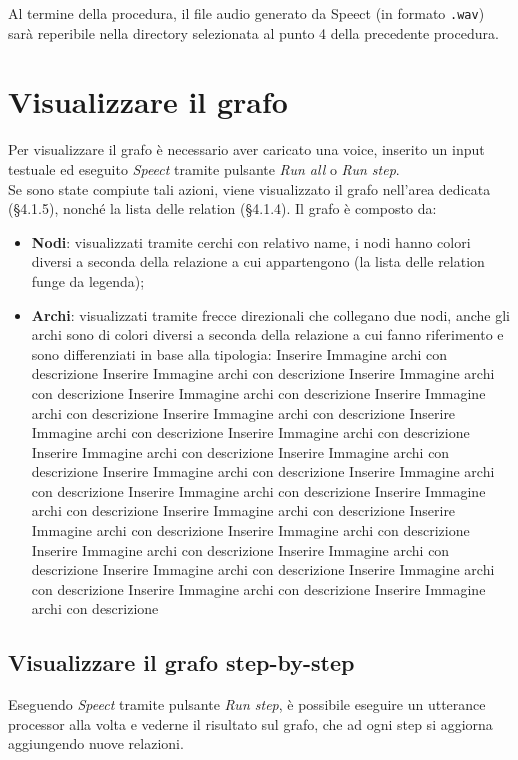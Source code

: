 \documentclass[openany,12pt,a4paper]{report}
\begin{document}
	\noindent Al termine della procedura, il file audio generato da Speect (in formato \verb|.wav|) sarà reperibile nella directory selezionata al punto 4 della precedente procedura.
	
	\section{Visualizzare il grafo}
	Per visualizzare il grafo è necessario aver caricato una voice, inserito un input testuale ed eseguito \textit{Speect} tramite pulsante \textit{Run all} o \textit{Run step}.\\
	Se sono state compiute tali azioni, viene visualizzato il grafo nell'area dedicata (§4.1.5), nonché la lista delle relation (§4.1.4).
	Il grafo è composto da:
	\begin{itemize}
		\item \textbf{Nodi}: visualizzati tramite cerchi con relativo name, i nodi hanno colori diversi a seconda della relazione a cui appartengono (la lista delle relation funge da legenda);
		\item \textbf{Archi}: visualizzati tramite frecce direzionali che collegano due nodi, anche gli archi sono di colori diversi a seconda della relazione a cui fanno riferimento e sono differenziati in base alla tipologia:
		Inserire Immagine archi con descrizione	Inserire Immagine archi con descrizione	Inserire Immagine archi con descrizione	Inserire Immagine archi con descrizione	Inserire Immagine archi con descrizione	Inserire Immagine archi con descrizione	Inserire Immagine archi con descrizione	Inserire Immagine archi con descrizione	Inserire Immagine archi con descrizione	Inserire Immagine archi con descrizione	Inserire Immagine archi con descrizione	Inserire Immagine archi con descrizione	Inserire Immagine archi con descrizione	Inserire Immagine archi con descrizione	Inserire Immagine archi con descrizione	Inserire Immagine archi con descrizione	Inserire Immagine archi con descrizione	Inserire Immagine archi con descrizione	Inserire Immagine archi con descrizione	Inserire Immagine archi con descrizione	Inserire Immagine archi con descrizione	Inserire Immagine archi con descrizione	Inserire Immagine archi con descrizione
	\end{itemize}
	
	\subsection{Visualizzare il grafo step-by-step}
	Eseguendo \textit{Speect} tramite pulsante \textit{Run step}, è possibile eseguire un utterance processor alla volta e vederne il risultato sul grafo, che ad ogni step si aggiorna aggiungendo nuove relazioni.
	
\end{document}
